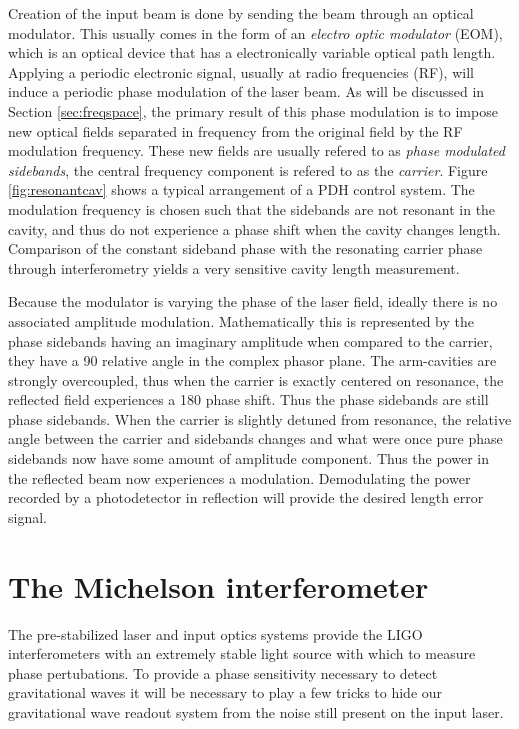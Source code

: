 Creation of the input beam is done by sending the beam through an optical modulator. %
This usually comes in the form of an \emph{electro optic modulator} (EOM), which is an optical device that has a electronically variable optical path length. %
Applying a periodic electronic signal, usually at radio frequencies (RF), will induce a periodic phase modulation of the laser beam. %
As will be discussed in Section \ref{sec:freqspace}, the primary result of this phase modulation is to impose new optical fields separated in frequency from the original field by the RF modulation frequency. %
These new fields are usually refered to as \emph{phase modulated sidebands}, the central frequency component is refered to as the \emph{carrier}. %
Figure \ref{fig:resonantcav} shows a typical arrangement of a PDH control system. %
The modulation frequency is chosen such that the sidebands are not resonant in the cavity, and thus do not experience a phase shift when the cavity changes length. %
Comparison of the constant sideband phase with the resonating carrier phase through interferometry yields a very sensitive cavity length measurement. %


Because the modulator is varying the phase of the laser field, ideally there is no associated amplitude modulation. %
Mathematically this is represented by the phase sidebands having an imaginary amplitude when compared to the carrier, they have a 90\degrees{} relative angle in the complex phasor plane. %
The arm-cavities are strongly overcoupled, thus when the carrier is exactly centered on resonance, the reflected field experiences a 180\degrees{} phase shift. %
Thus the phase sidebands are still phase sidebands. %
When the carrier is slightly detuned from resonance, the relative angle between the carrier and sidebands changes and what were once pure phase sidebands now have some amount of amplitude component. %
Thus the power in the reflected beam now experiences a modulation. %
Demodulating the power recorded by a photodetector in reflection will provide the desired length error signal.

\section{The Michelson interferometer}
The pre-stabilized laser and input optics systems provide the LIGO interferometers with an extremely stable light source with which to measure phase pertubations. %
To provide a phase sensitivity necessary to detect gravitational waves it will be necessary to play a few tricks to hide our gravitational wave readout system from the noise still present on the input laser.

